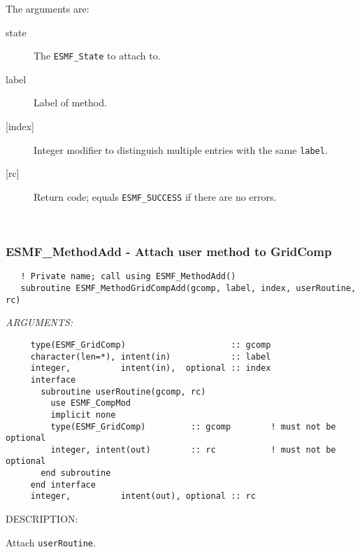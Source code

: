    The arguments are:
   \begin{description}
   \item[state]
     The {\tt ESMF\_State} to attach to.
   \item[label]
     Label of method.
   \item[{[index]}]
     Integer modifier to distinguish multiple entries with the same {\tt label}.
   \item[{[rc]}]
     Return code; equals {\tt ESMF\_SUCCESS} if there are no errors.
   \end{description}
   
 
\mbox{}\hrulefill\ 
 
\subsubsection [ESMF\_MethodAdd] {ESMF\_MethodAdd - Attach user method to GridComp}


  
\begin{verbatim}   ! Private name; call using ESMF_MethodAdd()
   subroutine ESMF_MethodGridCompAdd(gcomp, label, index, userRoutine, rc)\end{verbatim}{\em ARGUMENTS:}
\begin{verbatim}     type(ESMF_GridComp)                     :: gcomp
     character(len=*), intent(in)            :: label
     integer,          intent(in),  optional :: index
     interface
       subroutine userRoutine(gcomp, rc)
         use ESMF_CompMod
         implicit none
         type(ESMF_GridComp)         :: gcomp        ! must not be optional
         integer, intent(out)        :: rc           ! must not be optional
       end subroutine
     end interface
     integer,          intent(out), optional :: rc \end{verbatim}
{\sf DESCRIPTION:\\ }


   Attach {\tt userRoutine}.
  
